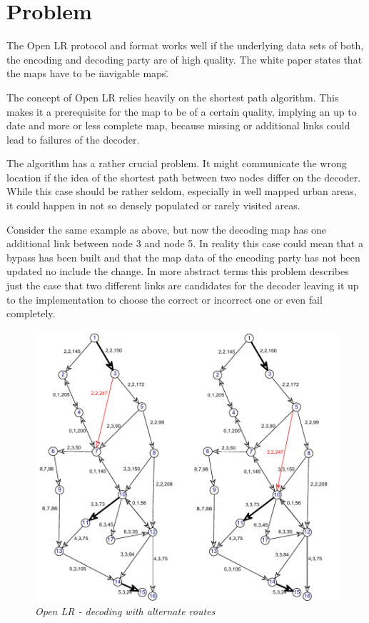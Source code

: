 \section{Problem} 
\label{sec:openlr-problem}

The Open LR protocol and format works well if the underlying data sets of both, the encoding and decoding party are of high quality. The white paper states that the maps have to be \"navigable maps\". 

The concept of Open LR relies heavily on the shortest path algorithm. This makes it a prerequisite for the map to be of a certain quality, implying an up to date and more or less complete map, because missing or additional links could lead to failures of the decoder. 

The algorithm has a rather crucial problem. It might communicate the wrong location if the idea of the shortest path between two nodes differ on the decoder. While this case should be rather seldom, especially in well mapped urban areas, it could happen in not so densely populated or rarely visited areas.

Consider the same example as above, but now the decoding map has one additional link between node 3 and node 5. In reality this case could mean that a bypass has been built and that the map data of the encoding party has not been updated no include the change. In more abstract terms this problem describes just the case that two different links are candidates for the decoder leaving it up to the implementation to choose the correct or incorrect one or even fail completely. 

\begin{figure}
  \includegraphics{fig/openlr-decoding-2.pdf}%
  \caption{\emph{Open LR - decoding with alternate routes}}%
  \label{fig:openlr-decoding-2}%
\end{figure}

